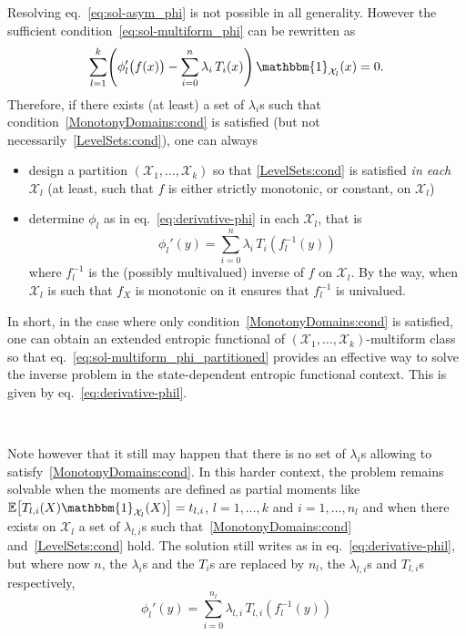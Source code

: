 \documentclass[entropy,article,submit,moreauthors,pdftex]{Definitions/mdpi}
\def\X{\mathcal{X}}%
\def\un{\mathbbm{1}}%
\newcommand{\Esp}[1]{\mathbb{E}\left[ #1 \right]}%
\begin{document}
Resolving  eq.~\eqref{eq:sol-asym_phi}  is  not   possible  in  all  generality.
However the  sufficient condition~\eqref{eq:sol-multiform_phi} can  be rewritten
as
%
\begin{equation}\label{eq:sol-multiform_phi_partitioned}
\sum_{l=1}^k  \left( \phi_l'\big(f(x)\big)  - \sum_{i=0}^n  \lambda_i \,  T_i(x)
\right) \, \un_{\X_l}(x) = 0.
\end{equation}
%
Therefore,  if  there  exists  (at  least)  a  set  of  $\lambda_i$s  such  that
condition~\ref{MonotonyDomains:cond}       is      satisfied       (but      not
necessarily~\ref{LevelSets:cond}), one can always
%
\begin{itemize}
\item design  a partition  $(\X_1,\ldots,\X_k)$ so that  \ref{LevelSets:cond} is
  satisfied {\em  in each $\X_l$}  (at least, such  that $f$ is  either strictly
  monotonic, or constant, on $\X_l$)
%
\item  determine $\phi_l$  as in  eq.~\eqref{eq:derivative-phi} in  each $\X_l$,
  that is
  \begin{equation}\label{eq:derivative-phil}
  \phi_l'(y) = \sum_{i=0}^n \lambda_i \, T_i \left(f_l^{-1}(y)\right)
  \end{equation}
  where $f_l^{-1}$  is the (possibly multivalued)  inverse of $f$ on  $\X_l$. By
  the  way, when  $\X_l$ is  such that  $f_X$ is  monotonic on  it ensures  that
  $f_l^{-1}$ is univalued.
\end{itemize}

In  short,  in  the  case  where  only  condition~\ref{MonotonyDomains:cond}  is
satisfied,    one   can    obtain   an    extended   entropic    functional   of
$(\X_1,\ldots,\X_k)$-multiform             class             so             that
eq.~\eqref{eq:sol-multiform_phi_partitioned} provides an  effective way to solve
the inverse problem in the  state-dependent entropic functional context. This is
given by eq.~\eqref{eq:derivative-phil}.

\

Note however  that it  still may  happen that  there is  no set  of $\lambda_i$s
allowing  to satisfy~\ref{MonotonyDomains:cond}.   In this  harder context,  the
problem remains  solvable when the moments  are defined as partial  moments like
$\Esp{T_{l,i}(X) \un_{\X_l}(X)} =  t_{l,i}$, $l = 1 ,  \ldots , k$ and $i  = 1 ,
\ldots ,  n_l$ and when  there exists on $\X_l$  a set of  $\lambda_{l,i}$s such
that~\ref{MonotonyDomains:cond}  and~\ref{LevelSets:cond}  hold.   The  solution
still  writes  as in  eq.~\eqref{eq:derivative-phil},  but  where now  $n$,  the
$\lambda_i$s  and the  $T_i$s are  replaced by  $n_l$, the  $\lambda_{l,i}$s and
$T_{l,i}$s respectively,
%
\begin{equation}\label{eq:derivative-phil-partial}
\phi_l'(y) = \sum_{i=0}^{n_l} \lambda_{l,i} \, T_{l,i} \left(f_l^{-1}(y)\right)
\end{equation}
\end{document}
